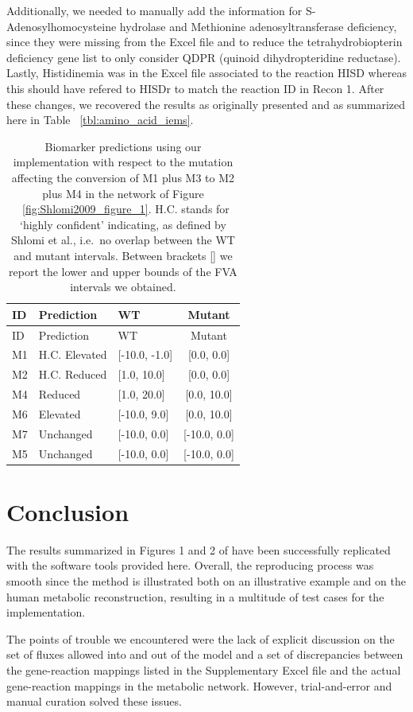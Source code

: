 \documentclass[10pt,a4paper,onecolumn]{article}
\begin{document}
Additionally, we needed to manually add the information for
S-Adenosylhomocysteine hydrolase and Methionine adenosyltransferase
deficiency, since they were missing from the Excel file and to reduce
the tetrahydrobiopterin deficiency gene list to only consider QDPR
(quinoid dihydropteridine reductase). Lastly, Histidinemia was in the
Excel file associated to the reaction HISD whereas this should have
refered to HISDr to match the reaction ID in Recon 1. After these
changes, we recovered the results as originally presented and as
summarized here in Table ~\ref{tbl:amino_acid_iems}.

\hypertarget{tbl:toy_model_results}{}
\begin{longtable}[]{@{}lllc@{}}
\caption{\label{tbl:toy_model_results}Biomarker predictions using our
implementation with respect to the mutation affecting the conversion of
M1 plus M3 to M2 plus M4 in the network of Figure
~\ref{fig:Shlomi2009_figure_1}. H.C. stands for `highly confident'
indicating, as defined by Shlomi et al., i.e.~no overlap between the WT
and mutant intervals. Between brackets {[}{]} we report the lower and
upper bounds of the FVA intervals we obtained. }\tabularnewline
\toprule
ID & Prediction & WT & Mutant\tabularnewline
\midrule
\endfirsthead
\toprule
ID & Prediction & WT & Mutant\tabularnewline
\midrule
\endhead
M1 & H.C. Elevated & {[}-10.0, -1.0{]} & {[}0.0, 0.0{]}\tabularnewline
M2 & H.C. Reduced & {[}1.0, 10.0{]} & {[}0.0, 0.0{]}\tabularnewline
M4 & Reduced & {[}1.0, 20.0{]} & {[}0.0, 10.0{]}\tabularnewline
M6 & Elevated & {[}-10.0, 9.0{]} & {[}0.0, 10.0{]}\tabularnewline
M7 & Unchanged & {[}-10.0, 0.0{]} & {[}-10.0, 0.0{]}\tabularnewline
M5 & Unchanged & {[}-10.0, 0.0{]} & {[}-10.0, 0.0{]}\tabularnewline
\bottomrule
\end{longtable}

\section{Conclusion}\label{conclusion}

The results summarized in Figures 1 and 2 of \autocite{Shlomi2009} have
been successfully replicated with the software tools provided here.
Overall, the reproducing process was smooth since the method is
illustrated both on an illustrative example and on the human metabolic
reconstruction, resulting in a multitude of test cases for the
implementation.

The points of trouble we encountered were the lack of explicit
discussion on the set of fluxes allowed into and out of the model and a
set of discrepancies between the gene-reaction mappings listed in the
Supplementary Excel file and the actual gene-reaction mappings in the
metabolic network. However, trial-and-error and manual curation solved
these issues.
\end{document}
